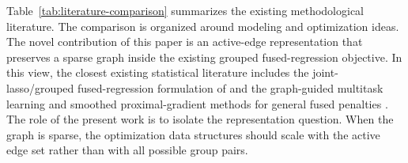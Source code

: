 \documentclass[twoside,11pt]{article}
\begin{document}
Table~\ref{tab:literature-comparison} summarizes the existing methodological literature. 
The comparison is organized around modeling and optimization ideas. 
The novel contribution of this paper is an active-edge representation that preserves a sparse graph inside the existing grouped fused-regression objective. 
In this view, the closest existing statistical literature includes the joint-lasso/grouped fused-regression formulation of \citet{dondelinger2020joint} and the graph-guided multitask learning and smoothed proximal-gradient methods for general fused penalties \citep{chen2010graph,chen2012smoothing}. 
The role of the present work is to isolate the representation question. 
When the graph is sparse, the optimization data structures should scale with the active edge set rather than with all possible group pairs.
\end{document}
